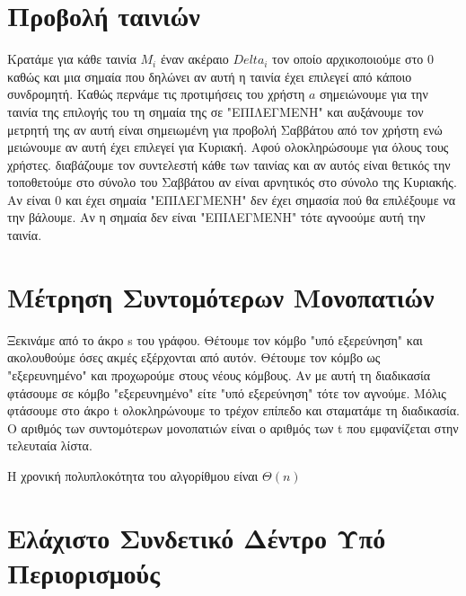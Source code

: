 \documentclass[a4paper,10pt]{article}
\begin{document}
\def\thesubsection {\alph{subsection}}
\renewcommand{\labelenumi}{\alph{enumi}}
\renewcommand{\labelenumii}{(\arabic{enumii})}

\section{Προβολή ταινιών} \setcounter{section}{1}

Κρατάμε για κάθε ταινία $M_i$ έναν ακέραιο $Delta_i$ τον οποίο αρχικοποιούμε
στο 0 καθώς και μια σημαία που δηλώνει αν αυτή η ταινία έχει επιλεγεί από
κάποιο συνδρομητή. Καθώς περνάμε τις προτιμήσεις του χρήστη $a$ σημειώνουμε
για την ταινία της επιλογής του τη σημαία της σε "ΕΠΙΛΕΓΜΕΝΗ" και αυξάνουμε
τον μετρητή της αν αυτή είναι σημειωμένη για προβολή Σαββάτου από τον χρήστη
ενώ μειώνουμε αν αυτή έχει επιλεγεί για Κυριακή. Αφού ολοκληρώσουμε για όλους
τους χρήστες. διαβάζουμε τον συντελεστή κάθε των ταινίας και αν αυτός είναι
θετικός την τοποθετούμε στο σύνολο του Σαββάτου αν είναι αρνητικός στο σύνολο
της Κυριακής. Αν είναι 0 και έχει σημαία "ΕΠΙΛΕΓΜΕΝΗ" δεν έχει σημασία πού θα
επιλέξουμε να την βάλουμε.  Αν η σημαία δεν είναι "ΕΠΙΛΕΓΜΕΝΗ" τότε αγνοούμε
αυτή την ταινία.

\section{Μέτρηση Συντομότερων Μονοπατιών}
Ξεκινάμε από το άκρο s του γράφου. Θέτουμε τον κόμβο "υπό εξερεύνηση" και
ακολουθούμε όσες ακμές εξέρχονται από αυτόν. Θέτουμε τον κόμβο ως
"εξερευνημένο" και προχωρούμε στους νέους κόμβους. Αν με αυτή τη διαδικασία
φτάσουμε σε κόμβο "εξερευνημένο" είτε "υπό εξερεύνηση" τότε τον αγνούμε. Μόλις
φτάσουμε στο άκρο t ολοκληρώνουμε το τρέχον επίπεδο και σταματάμε τη
διαδικασία. Ο αριθμός των συντομότερων μονοπατιών είναι ο αριθμός των t που
εμφανίζεται στην τελευταία λίστα.

Η χρονική πολυπλοκότητα του αλγορίθμου είναι $\Theta(n)$

\section{Ελάχιστο Συνδετικό Δέντρο Υπό Περιορισμούς}
\end{document}
